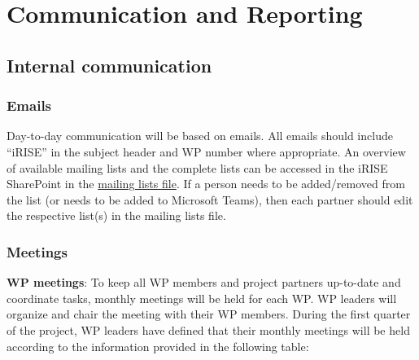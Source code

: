 \documentclass[
]{article}
\begin{document}
\hypertarget{communication-and-reporting}{%
\section{\texorpdfstring{\textbf{Communication and Reporting}}{Communication and Reporting}}\label{communication-and-reporting}}

\hypertarget{internal-communication}{%
\subsection{Internal communication}\label{internal-communication}}

\hypertarget{emails}{%
\subsubsection{Emails}\label{emails}}

Day-to-day communication will be based on emails. All emails should include ``iRISE'' in the subject header and WP number where appropriate. An overview of available mailing lists and the complete lists can be accessed in the iRISE SharePoint in the \href{https://charitede.sharepoint.com/:w:/r/sites/iRISE/Shared\%20Documents/General/iRISE\%20Mailing\%20List\%20Full.docx?d=w78aadfc66f9b4bdc878dd41138496398\&csf=1\&web=1\&e=xnGHy4}{mailing lists file}. If a person needs to be added/removed from the list (or needs to be added to Microsoft Teams), then each partner should edit the respective list(s) in the mailing lists file.

\hypertarget{meetings}{%
\subsubsection{Meetings}\label{meetings}}

\textbf{WP meetings}: To keep all WP members and project partners up-to-date and coordinate tasks, monthly meetings will be held for each WP. WP leaders will organize and chair the meeting with their WP members. During the first quarter of the project, WP leaders have defined that their monthly meetings will be held according to the information provided in the following table:
\end{document}
